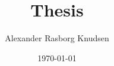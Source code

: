 \documentclass[English, oneside, 12pt]{memoir}
\title{Thesis}
\author{Alexander Rasborg Knudsen}
\date{\today}
\begin{document}
	

\maketitle

\newpage



\tableofcontents 	%
\newpage
\listoffigures
\newpage
\listoftables
\listoffixmes 	%

\newpage












\end{document}
